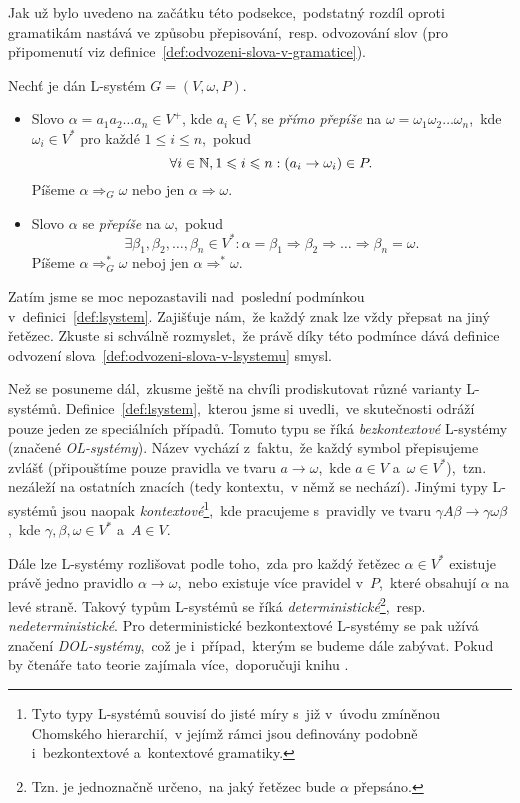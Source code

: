 Jak už bylo uvedeno na začátku této podsekce,~podstatný rozdíl oproti gramatikám nastává ve způsobu přepisování,~resp. odvozování slov (pro připomenutí viz definice~\ref{def:odvozeni-slova-v-gramatice}).
\begin{definition}\label{def:odvozeni-slova-v-lsystemu}
    Nechť je dán L-systém $G=(V,\omega,P)$.
    \begin{itemize}
        \item Slovo $\alpha=a_1a_2\ldots a_n\in V^+$, kde $a_i\in V$, se \emph{přímo přepíše} na $\omega=\omega_1\omega_2\ldots\omega_n$,~kde $\omega_i\in V^*$ pro každé $1\leqslant i\leqslant n$,~pokud
        \[\forall i\in\mathbb{N},1\leqslant i\leqslant n: (a_i\to\omega_i)\in P.\]
        Píšeme $\alpha\Rightarrow_G\omega$ nebo jen $\alpha\Rightarrow\omega$.
        \item Slovo $\alpha$ se \emph{přepíše} na $\omega$,~pokud
        \[\exists\beta_1,\beta_2,\ldots,\beta_n\in V^*:\alpha=\beta_1\Rightarrow\beta_2\Rightarrow\dots\Rightarrow\beta_n=\omega.\]
        Píšeme $\alpha\Rightarrow_G^*\omega$ neboj jen $\alpha\Rightarrow^*\omega$.
    \end{itemize}
\end{definition}
Zatím jsme se moc nepozastavili nad~poslední podmínkou v~definici~\ref{def:lsystem}. Zajišťuje nám,~že každý znak lze vždy přepsat na jiný řetězec. Zkuste si schválně rozmyslet,~že právě díky této podmínce dává definice odvození slova~\ref{def:odvozeni-slova-v-lsystemu} smysl.

Než se posuneme dál,~zkusme ještě na chvíli prodiskutovat různé varianty L-systémů. Definice~\ref{def:lsystem},~kterou jsme si uvedli,~ve skutečnosti odráží pouze jeden ze speciálních případů. Tomuto typu se říká \emph{bezkontextové} L-systémy (značené \emph{OL-systémy}). Název vychází z~faktu,~že každý symbol přepisujeme zvlášť (připouštíme pouze pravidla ve tvaru $a\to\omega$,~kde $a\in V$ a~$\omega\in V^*$),~tzn. nezáleží na ostatních znacích (tedy kontextu,~v němž se nechází). Jinými typy L-systémů jsou naopak \emph{kontextové}\footnote{Tyto typy L-systémů souvisí do jisté míry s~již v~úvodu zmíněnou Chomského hierarchií,~v jejímž rámci jsou definovány podobně i~bezkontextové a~kontextové gramatiky.},~kde pracujeme s~pravidly ve tvaru $\gamma A\beta\to\gamma\omega\beta$,~kde $\gamma,\beta,\omega\in V^*$ a~$A\in V$.

Dále lze L-systémy rozlišovat podle toho,~zda pro každý řetězec $\alpha\in V^*$ existuje právě jedno pravidlo $\alpha\to\omega$,~nebo existuje více pravidel v~$P$,~které obsahují $\alpha$ na levé straně. Takový typům L-systémů se říká \emph{deterministické}\footnote{Tzn. je jednoznačně určeno,~na jaký řetězec bude $\alpha$ přepsáno.},~resp. \emph{nedeterministické}. Pro deterministické bezkontextové L-systémy se pak užívá značení \emph{DOL-systémy},~což je i~případ,~kterým se budeme dále zabývat. Pokud by čtenáře tato teorie zajímala více,~doporučuji knihu \cite{Prusinkiewicz1990}.

